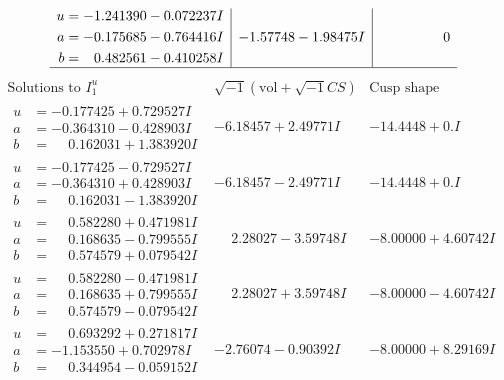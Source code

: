 \documentclass[1p]{elsarticle_modified}
\theoremstyle{definition}
\newcommand{\I}{\sqrt{-1}}
\begin{document}
$$\begin{array}{c|c|c}
\begin{aligned}
u &= -1.241390 - 0.072237 I \\
a &= -0.175685 - 0.764416 I \\
b &= \phantom{-}0.482561 - 0.410258 I\end{aligned}
 & -1.57748 - 1.98475 I & \phantom{-0.000000 } 0\\
 \hline 
 \end{array}$$\newpage$$\begin{array}{c|c|c}  
\text{Solutions to }I^u_{1}& \I (\text{vol} + \sqrt{-1}CS) & \text{Cusp shape}\\
 \hline 
\begin{aligned}
u &= -0.177425 + 0.729527 I \\
a &= -0.364310 - 0.428903 I \\
b &= \phantom{-}0.162031 + 1.383920 I\end{aligned}
 & -6.18457 + 2.49771 I & -14.4448 + 0. I\phantom{ +0.000000I} \\ \hline\begin{aligned}
u &= -0.177425 - 0.729527 I \\
a &= -0.364310 + 0.428903 I \\
b &= \phantom{-}0.162031 - 1.383920 I\end{aligned}
 & -6.18457 - 2.49771 I & -14.4448 + 0. I\phantom{ +0.000000I} \\ \hline\begin{aligned}
u &= \phantom{-}0.582280 + 0.471981 I \\
a &= \phantom{-}0.168635 - 0.799555 I \\
b &= \phantom{-}0.574579 + 0.079542 I\end{aligned}
 & \phantom{-}2.28027 - 3.59748 I & -8.00000 + 4.60742 I \\ \hline\begin{aligned}
u &= \phantom{-}0.582280 - 0.471981 I \\
a &= \phantom{-}0.168635 + 0.799555 I \\
b &= \phantom{-}0.574579 - 0.079542 I\end{aligned}
 & \phantom{-}2.28027 + 3.59748 I & -8.00000 - 4.60742 I \\ \hline\begin{aligned}
u &= \phantom{-}0.693292 + 0.271817 I \\
a &= -1.153550 + 0.702978 I \\
b &= \phantom{-}0.344954 - 0.059152 I\end{aligned}
 & -2.76074 - 0.90392 I & -8.00000 + 8.29169 I \\ \hline\begin{aligned}

\end{aligned}
\end{array}$$
\end{document}
